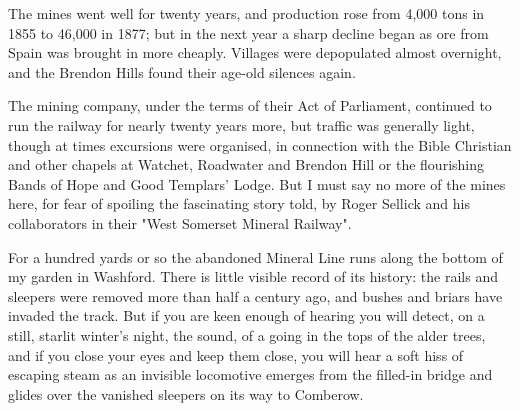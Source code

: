 The mines went well for twenty years, and production rose from 4,000 tons in 1855 to 46,000 in 1877; but in the next year a sharp decline began as ore from Spain was brought in more cheaply. Villages were depopulated almost overnight, and the Brendon Hills found their age-old silences again.

The mining company, under the terms of their Act of Parliament, continued to run the railway for nearly twenty years more, but traffic was generally light, though at times excursions were organised, in connection with the Bible Christian and other chapels at Watchet, Roadwater and Brendon Hill or the flourishing Bands of Hope and Good Templars' Lodge. But I must say no more of the mines here, for fear of spoiling the fascinating story told, by Roger Sellick and his collaborators in their "West Somerset Mineral Railway".
 
\Flourish 
 
For a hundred yards or so the abandoned Mineral Line runs along the bottom of my garden in Washford. There is little visible record of its history: the rails and sleepers were removed more than half a century ago, and bushes and briars have invaded the track. But if you are keen enough of hearing you will detect, on a still, starlit winter’s night, the sound, of a going in the tops of the alder trees, and if you close your eyes and keep them close, you will hear a soft hiss of escaping steam as an invisible locomotive emerges from the filled-in bridge and glides over the vanished sleepers on its way to Comberow.